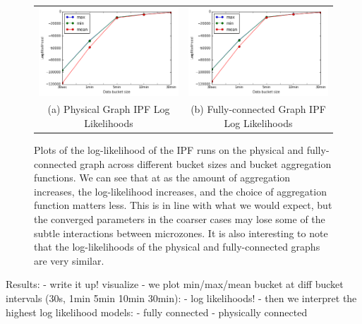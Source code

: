 \begin{figure}[h]
\centering
\begin{tabular}{cc}
\includegraphics[width=.4\linewidth]{figs/physical_loglikelihood} & \includegraphics[width=.4\linewidth]{figs/full_loglikelihood} \\
(a) Physical Graph IPF Log Likelihoods & (b) Fully-connected Graph IPF Log Likelihoods \\[6pt]
\end{tabular}
\caption{Plots of the log-likelihood of the IPF runs on the physical and fully-connected graph across different bucket sizes and bucket aggregation functions. We can see that at as the amount of aggregation increases, the log-likelihood increases, and the choice of aggregation function matters less. This is in line with what we would expect, but the converged parameters in the coarser cases may lose some of the subtle interactions between microzones.
It is also interesting to note that the log-likelihoods of the physical and fully-connected graphs are very similar.}
\label{fig:loglikelihood}
\end{figure}

Results:
- write it up! visualize
- we plot min/max/mean bucket at diff bucket intervals (30s, 1min 5min 10min 30min):
    - log likelihoods!
- then we interpret the highest log likelihood models:
    - fully connected
    - physically connected
\fi
